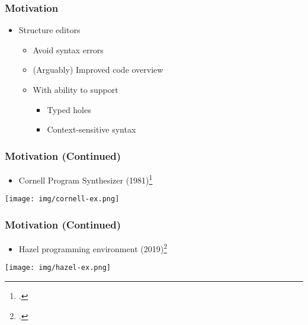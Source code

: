 \documentclass[t,24pt,aspectratio=169]{beamer}
\begin{document}
\begin{frame}[hvid]
    \frametitle{Motivation}
    \begin{itemize}
        \item Structure editors
              \begin{itemize}
                  \pause
                  \item Avoid syntax errors
                        \pause
                  \item (Arguably) Improved code overview
                        \pause
                  \item With ability to support
                        \begin{itemize}
                            \pause
                            \item Typed holes
                                  \pause
                            \item Context-sensitive syntax
                        \end{itemize}
              \end{itemize}
    \end{itemize}
\end{frame}


\begin{frame}[hvid]
    \frametitle{Motivation (Continued)}

    \begin{multicols}{2}
        \begin{itemize}
            \item Cornell Program Synthesizer (1981)\footcite{timtom81}

        \end{itemize}
        \vfill\null
        \columnbreak
        \texttt{[image: img/cornell-ex.png]}
    \end{multicols}
\end{frame}

\begin{frame}[hvid]
    \frametitle{Motivation (Continued)}

    \begin{multicols}{2}
        \begin{itemize}
            \item Hazel programming environment (2019)\footcite{omar}

        \end{itemize}

        \columnbreak
        \texttt{[image: img/hazel-ex.png]}
    \end{multicols}
\end{frame}
\end{document}
